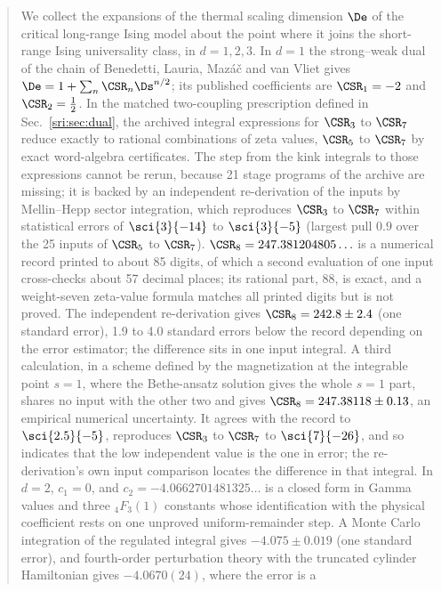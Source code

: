 


\begin{abstract}
\noindent
We collect the expansions of the thermal scaling dimension $\De$ of the critical long-range Ising model about the
point where it joins the short-range Ising universality class, in $d=1,2,3$. In $d=1$ the strong--weak dual of the
chain of Benedetti, Lauria, Maz\'a\v c and van Vliet gives $\De=1+\sum_n\CSR_n\Ds^{n/2}$; its published coefficients
are $\CSR_1=-2$ and $\CSR_2=\frac12$. In the matched two-coupling prescription defined in Sec.~\ref{sri:sec:dual}, the
archived integral expressions for $\CSR_3$ to $\CSR_7$ reduce exactly to rational combinations of zeta values,
$\CSR_5$ to $\CSR_7$ by exact word-algebra certificates. The step from the kink integrals to those expressions cannot
be rerun, because 21 stage programs of the archive are missing; it is backed by an independent re-derivation of the
inputs by Mellin--Hepp sector integration, which reproduces $\CSR_3$ to $\CSR_7$ within statistical errors of
$\sci{3}{-14}$ to $\sci{3}{-5}$ (largest pull $0.9$ over the 25 inputs of $\CSR_5$ to $\CSR_7$).
$\CSR_8=247.381204805\ldots$ is a numerical record printed to about 85 digits, of which a second evaluation of one
input cross-checks about 57 decimal places; its rational part, 88, is exact, and a weight-seven zeta-value formula
matches all printed digits but is not proved. The independent re-derivation gives $\CSR_8=242.8\pm2.4$ (one
standard error), 1.9 to 4.0 standard errors below the record depending on the error estimator; the difference sits
in one input integral. A third calculation, in a scheme defined by the magnetization at the integrable point $s=1$,
where the Bethe-ansatz solution gives the whole $s=1$ part, shares no input with the other two and gives
$\CSR_8=247.38118\pm0.13$, an empirical numerical uncertainty. It agrees with the record to $\sci{2.5}{-5}$, reproduces
$\CSR_3$ to $\CSR_7$ to $\sci{7}{-26}$, and so indicates that the low independent value is the one in error; the
re-derivation's own input comparison locates the difference in that integral. In $d=2$, $c_1=0$, and $c_2=-4.0662701481325\ldots$ is a closed form in Gamma values and three
${}_4F_3(1)$ constants whose identification with the physical coefficient rests on one unproved uniform-remainder
step. A Monte Carlo integration of the regulated integral gives $-4.075\pm0.019$ (one standard error), and
fourth-order perturbation theory with the truncated cylinder Hamiltonian gives $-4.0670(24)$, where the error is a

\end{abstract}
